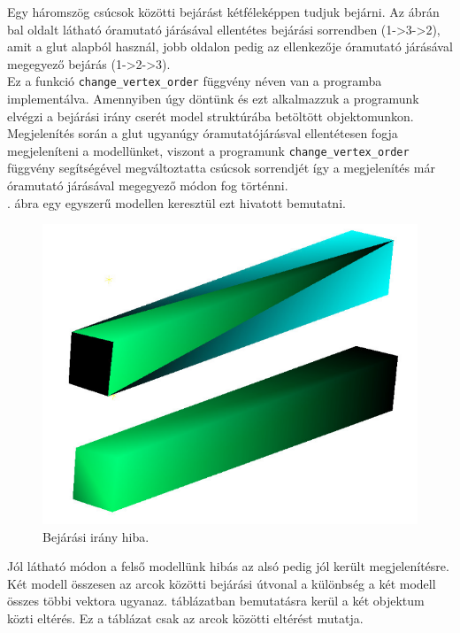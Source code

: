 Egy háromszög csúcsok közötti bejárást kétféleképpen tudjuk bejárni. Az ábrán bal oldalt látható  óramutató járásával ellentétes bejárási sorrendben (1->3->2), amit a glut alapból használ, jobb oldalon pedig az ellenkezője óramutató járásával megegyező bejárás (1->2->3).\\

Ez a funkció \texttt{change\_vertex\_order} függvény néven van a programba implementálva. Amennyiben úgy döntünk és ezt alkalmazzuk a programunk elvégzi a bejárási irány cserét model struktúrába betöltött objektomunkon.\\

Megjelenítés során a glut ugyanúgy óramutatójárásval ellentétesen fogja megjeleníteni a modellünket, viszont a programunk \texttt{change\_vertex\_order} függvény segítségével megváltoztatta csúcsok sorrendjét így a megjelenítés már óramutató járásával megegyező módon fog történni.\\
\newpage
{}. ábra egy egyszerű modellen keresztül ezt hivatott bemutatni.
\bigskip
\begin{figure}[h]
\centering
\includegraphics[scale=0.5]{images/order.png}
\caption{Bejárási irány hiba.}
\label{fig:bej2}
\end{figure}
\bigskip

Jól látható módon a felső modellünk hibás az alsó pedig jól került megjelenítésre. Két modell összesen az arcok közötti bejárási útvonal a különbség a két modell összes többi vektora ugyanaz. táblázatban bemutatásra kerül a két objektum közti eltérés. Ez a táblázat csak az arcok közötti eltérést mutatja.

